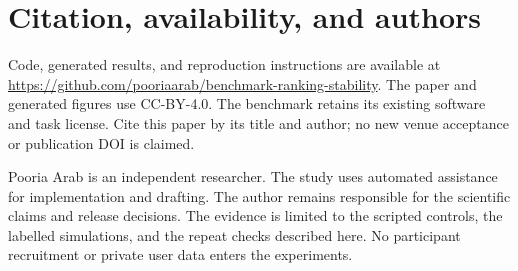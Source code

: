 \documentclass{article}
\begin{document}
\section{Citation, availability, and authors}
Code, generated results, and reproduction instructions are available at \url{https://github.com/pooriaarab/benchmark-ranking-stability}. The paper and generated figures use CC-BY-4.0. The benchmark retains its existing software and task license. Cite this paper by its title and author; no new venue acceptance or publication DOI is claimed.\par
Pooria Arab is an independent researcher. The study uses automated assistance for implementation and drafting. The author remains responsible for the scientific claims and release decisions. The evidence is limited to the scripted controls, the labelled simulations, and the repeat checks described here. No participant recruitment or private user data enters the experiments.\par


\end{document}
